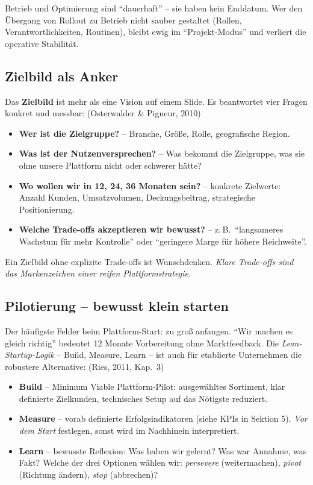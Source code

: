 \documentclass[11pt,a4paper,oneside]{article}
\newcommand{\fachbegriff}[1]{\textbf{#1}}
\newcommand{\quelle}[1]{{\footnotesize\color{lpGray}(#1)}}
\begin{document}
\medskip

\noindent Betrieb und Optimierung sind ``dauerhaft'' -- sie haben kein Enddatum. Wer den Übergang von Rollout zu Betrieb nicht sauber gestaltet (Rollen, Verantwortlichkeiten, Routinen), bleibt ewig im ``Projekt-Modus'' und verliert die operative Stabilität.

\subsection{Zielbild als Anker}

Das \fachbegriff{Zielbild} ist mehr als eine Vision auf einem Slide. Es beantwortet vier Fragen konkret und messbar: \quelle{Osterwalder \& Pigneur, 2010}

\begin{itemize}
  \item \textbf{Wer ist die Zielgruppe?} -- Branche, Größe, Rolle, geografische Region.
  \item \textbf{Was ist der Nutzenversprechen?} -- Was bekommt die Zielgruppe, was sie ohne unsere Plattform nicht oder schwerer hätte?
  \item \textbf{Wo wollen wir in 12, 24, 36 Monaten sein?} -- konkrete Zielwerte: Anzahl Kunden, Umsatzvolumen, Deckungsbeitrag, strategische Positionierung.
  \item \textbf{Welche Trade-offs akzeptieren wir bewusst?} -- z.\,B.\ ``langsameres Wachstum für mehr Kontrolle'' oder ``geringere Marge für höhere Reichweite''.
\end{itemize}

Ein Zielbild ohne explizite Trade-offs ist Wunschdenken. \emph{Klare Trade-offs sind das Markenzeichen einer reifen Plattformstrategie.}

\subsection{Pilotierung -- bewusst klein starten}

Der häufigste Fehler beim Plattform-Start: zu groß anfangen. ``Wir machen es gleich richtig'' bedeutet 12 Monate Vorbereitung ohne Marktfeedback. Die \emph{Lean-Startup-Logik} -- Build, Measure, Learn -- ist auch für etablierte Unternehmen die robustere Alternative: \quelle{Ries, 2011, Kap.~3}

\begin{itemize}
  \item \fachbegriff{Build} -- Minimum Viable Plattform-Pilot: ausgewähltes Sortiment, klar definierte Zielkunden, technisches Setup auf das Nötigste reduziert.
  \item \fachbegriff{Measure} -- vorab definierte Erfolgsindikatoren (siehe KPIs in Sektion 5). \emph{Vor dem Start} festlegen, sonst wird im Nachhinein interpretiert.
  \item \fachbegriff{Learn} -- bewusste Reflexion: Was haben wir gelernt? Was war Annahme, was Fakt? Welche der drei Optionen wählen wir: \emph{persevere} (weitermachen), \emph{pivot} (Richtung ändern), \emph{stop} (abbrechen)?
\end{itemize}
\end{document}
